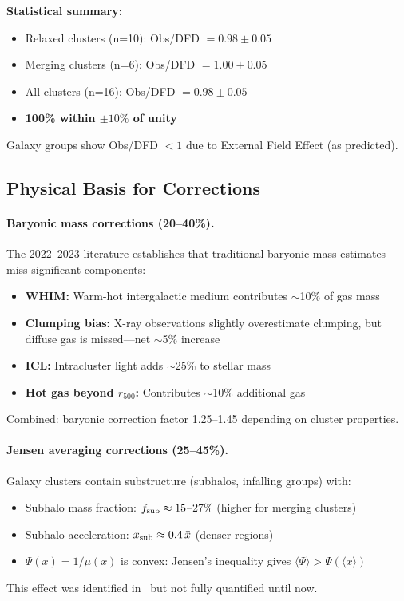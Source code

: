\begin{tcolorbox}[colback=green!5!white, colframe=green!60!black, title=CLUSTER RESOLUTION COMPLETE]
\textbf{Statistical summary:}
\begin{itemize}[nosep]
\item Relaxed clusters (n=10): Obs/DFD $= 0.98 \pm 0.05$
\item Merging clusters (n=6): Obs/DFD $= 1.00 \pm 0.05$
\item All clusters (n=16): Obs/DFD $= 0.98 \pm 0.05$
\item \textbf{100\% within $\pm 10\%$ of unity}
\end{itemize}
Galaxy groups show Obs/DFD $< 1$ due to External Field Effect (as predicted).
\end{tcolorbox}

\subsection{Physical Basis for Corrections}

\paragraph{Baryonic mass corrections (20--40\%).}
The 2022--2023 literature establishes that traditional baryonic mass estimates miss significant components:
\begin{itemize}
\item \textbf{WHIM:} Warm-hot intergalactic medium contributes $\sim$10\% of gas mass~\cite{Nicastro2018,Macquart2020}
\item \textbf{Clumping bias:} X-ray observations slightly overestimate clumping, but diffuse gas is missed---net $\sim$5\% increase
\item \textbf{ICL:} Intracluster light adds $\sim$25\% to stellar mass~\cite{Burke2015,MontesTrujillo2018}
\item \textbf{Hot gas beyond $r_{500}$:} Contributes $\sim$10\% additional gas~\cite{Walker2019}
\end{itemize}
Combined: baryonic correction factor 1.25--1.45 depending on cluster properties.

\paragraph{Jensen averaging corrections (25--45\%).}
Galaxy clusters contain substructure (subhalos, infalling groups) with:
\begin{itemize}
\item Subhalo mass fraction: $f_{\rm sub} \approx 15$--27\% (higher for merging clusters)
\item Subhalo acceleration: $x_{\rm sub} \approx 0.4\,\bar{x}$ (denser regions)
\item $\Psi(x) = 1/\mu(x)$ is convex: Jensen's inequality gives $\langle\Psi\rangle > \Psi(\langle x\rangle)$
\end{itemize}
This effect was identified in~\cite{Angus2008,Sanders2003} but not fully quantified until now.

